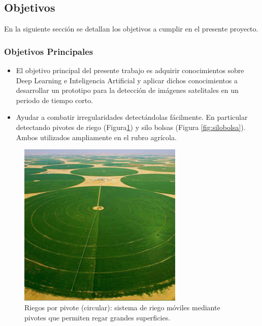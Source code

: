 \subsection{Objetivos}
En la siguiente sección se detallan los objetivos a cumplir en el presente proyecto.
\subsubsection{Objetivos Principales}
\begin{itemize}
    \item El objetivo principal del presente trabajo es adquirir conocimientos sobre Deep Learning e Inteligencia Artificial y aplicar dichos conocimientos a desarrollar un prototipo para la detección de imágenes satelitales en un periodo de tiempo corto.\\
    
    \item Ayudar a combatir irregularidades detectándolas fácilmente. En particular detectando pivotes de riego (Figura\ref{fig:pivot}) y silo bolsas (Figura \ref{fig:silobolsa}). Ambos utilizados ampliamente en el rubro agrícola.
\end{itemize}

    \begin{figure}
        \centering
        \includegraphics[width=0.7\textwidth]{img/pivot.png}
        \caption{Riegos por pivote (circular): sistema de riego móviles mediante pivotes que permiten regar grandes superficies.}
        \label{fig:pivot}
    \end{figure}
    
